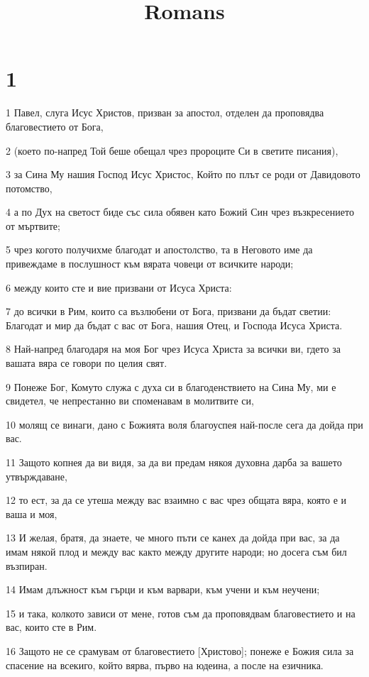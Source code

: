 

\title{Romans}


\chapter{1}

\par 1 Павел, слуга Исус Христов, призван за апостол, отделен да проповядва благовестието от Бога,
\par 2 (което по-напред Той беше обещал чрез пророците Си в светите писания),
\par 3 за Сина Му нашия Господ Исус Христос, Който по плът се роди от Давидовото потомство,
\par 4 а по Дух на светост биде със сила обявен като Божий Син чрез възкресението от мъртвите;
\par 5 чрез когото получихме благодат и апостолство, та в Неговото име да привеждаме в послушност към вярата човеци от всичките народи;
\par 6 между които сте и вие призвани от Исуса Христа:
\par 7 до всички в Рим, които са възлюбени от Бога, призвани да бъдат светии: Благодат и мир да бъдат с вас от Бога, нашия Отец, и Господа Исуса Христа.
\par 8 Най-напред благодаря на моя Бог чрез Исуса Христа за всички ви, гдето за вашата вяра се говори по целия свят.
\par 9 Понеже Бог, Комуто служа с духа си в благоденствието на Сина Му, ми е свидетел, че непрестанно ви споменавам в молитвите си,
\par 10 молящ се винаги, дано с Божията воля благоуспея най-после сега да дойда при вас.
\par 11 Защото копнея да ви видя, за да ви предам някоя духовна дарба за вашето утвърждаване,
\par 12 то ест, за да се утеша между вас взаимно с вас чрез общата вяра, която е и ваша и моя,
\par 13 И желая, братя, да знаете, че много пъти се канех да дойда при вас, за да имам някой плод и между вас както между другите народи; но досега съм бил възпиран.
\par 14 Имам длъжност към гърци и към варвари, към учени и към неучени;
\par 15 и така, колкото зависи от мене, готов съм да проповядвам благовестието и на вас, които сте в Рим.
\par 16 Защото не се срамувам от благовестието [Христово]; понеже е Божия сила за спасение на всекиго, който вярва, първо на юдеина, а после на езичника.
